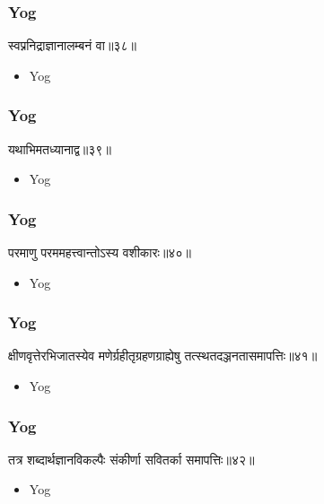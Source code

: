 \begin{frame}[fragile]\frametitle{Yog}
\begin{sanskrit}
स्वप्ननिद्राज्ञानालम्बनं वा॥३८॥
\end{sanskrit}
	\begin{itemize}
	\item Yog 
	\end{itemize}
\end{frame}



\begin{frame}[fragile]\frametitle{Yog}
\begin{sanskrit}
यथाभिमतध्यानाद्व॥३९॥
\end{sanskrit}
	\begin{itemize}
	\item Yog 
	\end{itemize}
\end{frame}




\begin{frame}[fragile]\frametitle{Yog}
\begin{sanskrit}
परमाणु परममहत्त्वान्तोऽस्य वशीकारः॥४०॥
\end{sanskrit}
	\begin{itemize}
	\item Yog 
	\end{itemize}
\end{frame}

\begin{frame}[fragile]\frametitle{Yog}
\begin{sanskrit}
क्षीणवृत्तेरभिजातस्येव मणेर्ग्रहीतृग्रहणग्राह्येषु तत्स्थतदञ्जनतासमापत्तिः॥४१॥
\end{sanskrit}
	\begin{itemize}
	\item Yog 
	\end{itemize}
\end{frame}

\begin{frame}[fragile]\frametitle{Yog}
\begin{sanskrit}
तत्र शब्दार्थज्ञानविकल्पैः संकीर्णा सवितर्का समापत्तिः॥४२॥
\end{sanskrit}
	\begin{itemize}
	\item Yog 
	\end{itemize}
\end{frame}


